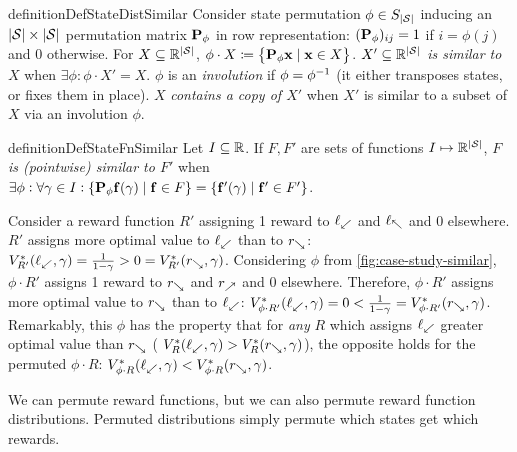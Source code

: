 \begin{restatable}{definition}{DefStateDistSimilar}\label{def:dist-sim}
Consider state permutation $\phi\in S_{\left|\mathcal{S}\right|}$ inducing an $\left|\mathcal{S}\right|\times \left|\mathcal{S}\right|$ permutation matrix $\mathbf{P}_{\phi}$ in row representation: $(\mathbf{P}_{\phi})_{ij}=1$ if $i=\phi(j)$ and $0$ otherwise. For $X\subseteq \mathbb{R}^{\left|\mathcal{S}\right|}$, $\phi\cdot X\coloneqq \left\{\mathbf{P}_{\phi} \mathbf{x} \mid \mathbf{x} \in X\right\}$. $X'\subseteq \mathbb{R}^{\left|\mathcal{S}\right|}$ \emph{is similar to $X$} when $\exists \phi: \phi\cdot X'=X$. $\phi$ is an \emph{involution} if $\phi=\phi^{-1}$ (it either transposes states, or fixes them in place). $X$ \emph{contains a copy of $X'$} when $X'$ is similar to a subset of $X$ via an involution $\phi$.
\end{restatable}
\begin{restatable}{definition}{DefStateFnSimilar}\label{def:dist-fn-sim}
Let $I\subseteq \mathbb{R}$. If $F,F'$ are sets of functions $I\mapsto \mathbb{R}^{\left|\mathcal{S}\right|}$, $F$ \emph{is (pointwise) similar to $F'$} when $\exists \phi:\forall \gamma\in I: \{\mathbf{P}_{\phi} \mathbf{f}(\gamma) \mid \mathbf{f} \in F\}= \{\mathbf{f}'(\gamma) \mid \mathbf{f}' \in F'\}$. \end{restatable} 
 
Consider a reward function $R'$ assigning 1 reward to  $\ell_{\swarrow}$ and $\ell_{\nwarrow}$ and 0 elsewhere. $R'$ assigns more optimal value to $\ell_{\swarrow}$ than to $r_{\searrow}$: $\VfNoResize[*][R']{\farleft,\gamma}=\geom> 0=\VfNoResize[*][R']{\farright,\gamma}$. Considering $\phi$ from \cref{fig:case-study-similar}, $\phi\cdot R'$ assigns 1 reward to $r_{\searrow}$ and $r_{\nearrow}$ and 0 elsewhere. Therefore, $\phi\cdot R'$ assigns more optimal value to $r_{\searrow}$ than to $\ell_{\swarrow}$: $\VfNoResize[*][\phi\cdot R']{\farleft,\gamma}=0<\geom =\VfNoResize[*][\phi\cdot R']{\farright,\gamma}$. Remarkably, this $\phi$ has the property that for \emph{any} $R$ which assigns $\ell_{\swarrow}$ greater optimal value than $r_{\searrow}$ (\ie{} $\VfNoResize{\farleft,\gamma}> \VfNoResize{\farright,\gamma}$), the opposite holds for the permuted $\phi\cdot R$: $\VfNoResize[*][\phi\cdot R]{\farleft,\gamma}< \VfNoResize[*][\phi\cdot R]{\farright,\gamma}$. 

We can permute reward functions, but we can also permute reward function distributions. Permuted distributions simply permute which states get which rewards.

